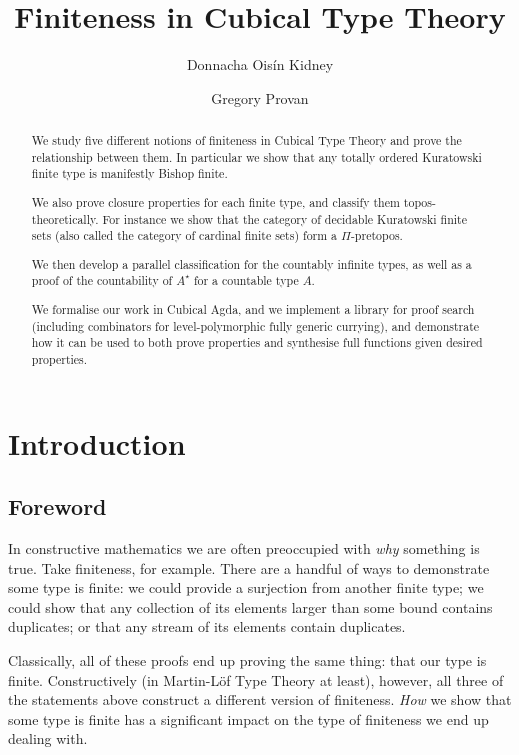 
\title{Finiteness in Cubical Type Theory}
\author{
  Donnacha Oisín Kidney  \and
  Gregory Provan 
}

\maketitle
\begin{abstract}
  We study five different notions of finiteness in Cubical Type Theory and prove
  the relationship between them.
  In particular we show that any totally ordered Kuratowski finite type is
  manifestly Bishop finite.

  We also prove closure properties for each finite type, and classify them
  topos-theoretically.
  For instance we show that the category of decidable Kuratowski finite sets
  (also called the category of cardinal finite sets) form a \(\Pi\)-pretopos.

  We then develop a parallel classification for the countably infinite types, as
  well as a proof of the countability of \(A^\star\) for a countable type \(A\).

  We formalise our work in Cubical Agda, and we implement a library for proof
  search (including combinators for level-polymorphic fully generic currying),
  and demonstrate how it can be used to both prove properties and synthesise
  full functions given desired properties.
\end{abstract}
\section{Introduction}
\subsection{Foreword}
In constructive mathematics we are often preoccupied with \emph{why} something
is true.
Take finiteness, for example.
There are a handful of ways to demonstrate some type is finite: we could provide
a surjection from another finite type; we could show that any collection of its
elements larger than some bound contains duplicates; or that any stream of its
elements contain duplicates.

Classically, all of these proofs end up proving the same thing: that our type is
finite.
Constructively (in Martin-Löf Type Theory
\cite{martin-lofIntuitionisticTypeTheory1980} at least), however, all three
of the statements above construct a different version of finiteness.
\emph{How} we show that some type is finite has a significant impact on the
type of finiteness we end up dealing with.

